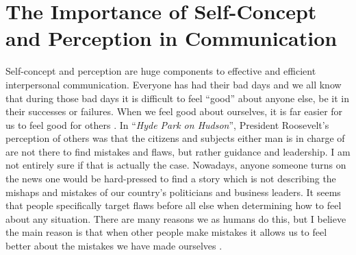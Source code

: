 \documentclass[stu,12pt]{apa7}
\begin{document}
  \section{The Importance of Self-Concept and Perception in Communication}
    Self-concept and perception are huge components to effective and efficient
      interpersonal communication. Everyone has had their bad days and we all
      know that during those bad days it is difficult to feel ``good'' about
      anyone else, be it in their successes or failures. When we feel good
      about ourselves, it is far easier for us to feel good for others
      \parencite{pan_exploring_2019}. In ``\textit{Hyde Park on Hudson}'',
      President Roosevelt's perception of others was that the citizens and
      subjects either man is in charge of are not there to find mistakes and
      flaws, but rather guidance and leadership. I am not entirely sure if that
      is actually the case. Nowadays, anyone someone turns on the news one would
      be hard-pressed to find a story which is not describing the mishaps and
      mistakes of our country's politicians and business leaders. It seems that
      people specifically target flaws before all else when determining how to
      feel about any situation. There are many reasons we as humans do this, but
      I believe the main reason is that when other people make mistakes it
      allows us to feel better about the mistakes we have made ourselves
      \parencite{gerd_antos_handbook_2008}.


  \newpage
  \printbibliography[%
    title={Works Cited},%
    heading={bibintoc},%
    notcategory={consulted}%
  ]

  \newpage
  \nocite{*}
  \printbibliography[%
    title={Works Consulted},%
    heading={bibintoc},%
    category={consulted}%
  ]
\end{document}
